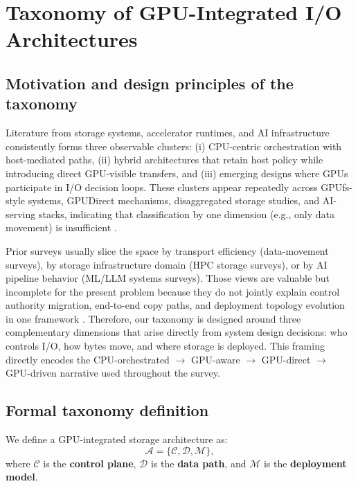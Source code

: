 \section{Taxonomy of GPU-Integrated I/O Architectures}\label{sec:taxonomy-anchor}

\subsection{Motivation and design principles of the taxonomy}

Literature from storage systems, accelerator runtimes, and AI infrastructure consistently forms three observable clusters: (i) CPU-centric orchestration with host-mediated paths, (ii) hybrid architectures that retain host policy while introducing direct GPU-visible transfers, and (iii) emerging designs where GPUs participate in I/O decision loops. These clusters appear repeatedly across GPUfs-style systems, GPUDirect mechanisms, disaggregated storage studies, and AI-serving stacks, indicating that classification by one dimension (e.g., only data movement) is insufficient \cite{silberstein2013gpufs,shahar2016gpufs,nvidia_gds_blog,nvidia_gdrdma,qureshi2023bam,geminifs2025,liu2017rackscale,kwon2023vllm,zhong2024distserve}.

Prior surveys usually slice the space by transport efficiency (data-movement surveys), by storage infrastructure domain (HPC storage surveys), or by AI pipeline behavior (ML/LLM systems surveys). Those views are valuable but incomplete for the present problem because they do not jointly explain control authority migration, end-to-end copy paths, and deployment topology evolution in one framework \cite{traub2023compstoragesurvey,zhang2025hpcstoragesurvey,murray2021tfdata}. Therefore, our taxonomy is designed around three complementary dimensions that arise directly from system design decisions: who controls I/O, how bytes move, and where storage is deployed. This framing directly encodes the CPU-orchestrated $\rightarrow$ GPU-aware $\rightarrow$ GPU-direct $\rightarrow$ GPU-driven narrative used throughout the survey.

\subsection{Formal taxonomy definition}

We define a GPU-integrated storage architecture as:
\begin{equation}
\mathcal{A} = \{\mathcal{C},\mathcal{D},\mathcal{M}\},
\end{equation}
where $\mathcal{C}$ is the \textbf{control plane}, $\mathcal{D}$ is the \textbf{data path}, and $\mathcal{M}$ is the \textbf{deployment model}.

